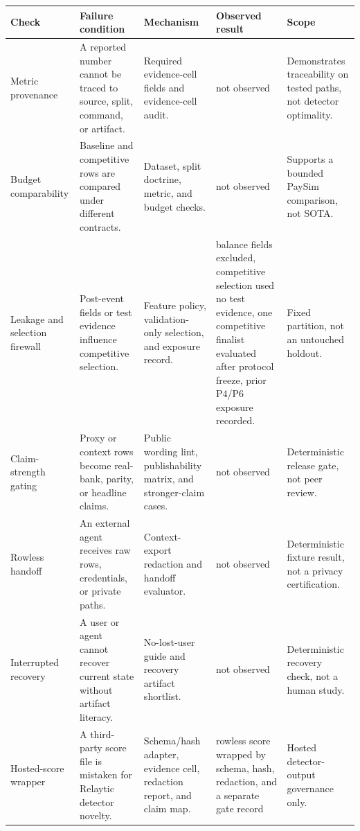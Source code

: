 \documentclass[11pt]{article}
\begin{document}
\begin{center}
\begin{minipage}{\linewidth}
\scriptsize
\setlength{\tabcolsep}{3pt}
\renewcommand{\arraystretch}{1.16}
\begin{tabularx}{\linewidth}{@{}>{\raggedright\arraybackslash}X >{\raggedright\arraybackslash}X >{\raggedright\arraybackslash}X >{\raggedright\arraybackslash}X >{\raggedright\arraybackslash}X@{}}
\toprule
Check & Failure condition & Mechanism & Observed result & Scope \\
\midrule
Metric provenance & A reported number cannot be traced to source, split, command, or artifact. & Required evidence-cell fields and evidence-cell audit. & not observed & Demonstrates traceability on tested paths, not detector optimality. \\
Budget comparability & Baseline and competitive rows are compared under different contracts. & Dataset, split doctrine, metric, and budget checks. & not observed & Supports a bounded PaySim comparison, not SOTA. \\
Leakage and selection firewall & Post-event fields or test evidence influence competitive selection. & Feature policy, validation-only selection, and exposure record. & 4 balance fields excluded, competitive selection used no test evidence, one competitive finalist evaluated after protocol freeze, prior P4/P6 exposure recorded. & Fixed partition, not an untouched holdout. \\
Claim-strength gating & Proxy or context rows become real-bank, parity, or headline claims. & Public wording lint, publishability matrix, and stronger-claim cases. & not observed & Deterministic release gate, not peer review. \\
Rowless handoff & An external agent receives raw rows, credentials, or private paths. & Context-export redaction and handoff evaluator. & not observed & Deterministic fixture result, not a privacy certification. \\
Interrupted recovery & A user or agent cannot recover current state without artifact literacy. & No-lost-user guide and recovery artifact shortlist. & not observed & Deterministic recovery check, not a human study. \\
Hosted-score wrapper & A third-party score file is mistaken for Relaytic detector novelty. & Schema/hash adapter, evidence cell, redaction report, and claim map. & rowless score wrapped by schema, hash, redaction, and a separate gate record & Hosted detector-output governance only. \\
\bottomrule
\end{tabularx}
\end{minipage}
\end{center}
\end{document}
